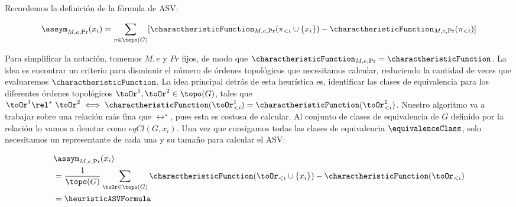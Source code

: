 \begin{comment}
	Heuristica para ASV
	Introducción
	Cantidad de órdenes topológicos de un DAG
	Queremos topoSorts(polyTree) pues nuestra red es un polytree.
	Cantidad de ordenes topológicos para un “árbol”.
	Cantidad de clases de equivalencia para un “árbol”
\end{comment}


Recordemos la definición de la fórmula de ASV:

\begin{align*}
	\assym_{M,e,\Pr}(x_i) = \sum_{\pi \in \topo(G)} [\charactheristicFunction_{M,e,\Pr}(\pi_{<i} \cup \{x_i\}) - \charactheristicFunction_{M,e,\Pr}(\pi_{<i})] 
\end{align*}

Para simplificar la notación, tomemos $M,e$ y $Pr$ fijos, de modo que $\charactheristicFunction_{M,e,\Pr} = \charactheristicFunction$. La idea es encontrar un criterio para disminuir el número de órdenes topológicos que necesitamos calcular, reduciendo la cantidad de veces que evaluaremos $\charactheristicFunction$. La idea principal detrás de esta heurística es, identificar las clases de equivalencia para los diferentes órdenes topológicos $\toOr^1, \toOr^2 \in \topo(G)$, tales que $\toOr^1 \rel^\star \ \toOr^2 \iff \charactheristicFunction(\toOr^1_{<i}) = \charactheristicFunction(\toOr^2_{<i}) $. Nuestro algoritmo va a trabajar sobre una relación \rel{} más fina que $\rel^\star$, pues esta es costosa de calcular. Al conjunto de clases de equivalencia de $G$ definido por la relación \rel{} lo vamos a denotar como $eqCl(G, x_i)$. Una vez que consigamos todas las clases de equivalencia $\equivalenceClass$, solo necesitamos un representante de cada una y su tamaño para calcular el ASV:

\begin{align*}
	&\assym_{M,e,\Pr}(x_i)\\
	&= \frac{1}{\topo(G)} \sum_{\toOr \in \topo(G)} \charactheristicFunction(\toOr_{<i} \cup \{x_i\}) - \charactheristicFunction(\toOr_{<i}) \\
	&=  \heuristicASVFormula
\end{align*}




